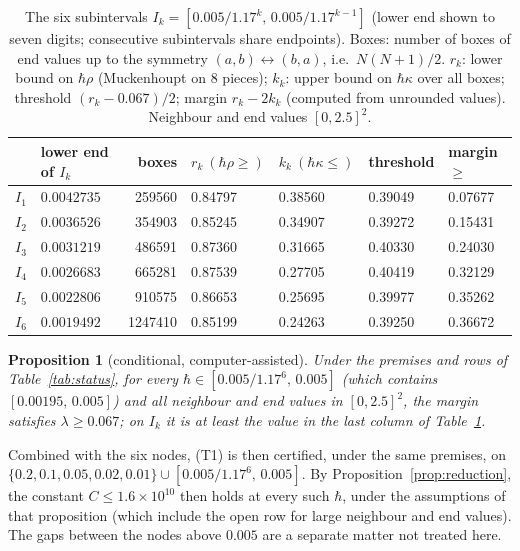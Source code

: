 \documentclass[11pt,a4paper]{article}
\newtheorem{proposition}[theorem]{Proposition}
\theoremstyle{definition}
\theoremstyle{remark}
\newcommand{\hk}{\hbar\kappa}
\newcommand{\hr}{\hbar\rho}
\begin{document}
\begin{table}[!htbp]\centering\small
\caption{The six subintervals $I_k=[0.005/1.17^k,\,0.005/1.17^{k-1}]$ (lower end shown to seven digits; consecutive subintervals share endpoints). Boxes: number of boxes of end values up to the symmetry $(a,b)\leftrightarrow(b,a)$, i.e.\ $N(N+1)/2$. $r_k$: lower bound on $\hr$ (Muckenhoupt on $8$ pieces); $k_k$: upper bound on $\hk$ over all boxes; threshold $(r_k-0.067)/2$; margin $r_k-2k_k$ (computed from unrounded values). Neighbour and end values $[0,2.5]^2$.}\label{tab:results}
\begin{tabular}{@{}llrllll@{}}\toprule
 & lower end of $I_k$ & boxes & $r_k\ (\hr\ge)$ & $k_k\ (\hk\le)$ & threshold & margin $\ge$\\\midrule
$I_1$ & $0.0042735$ & 259560 & 0.84797 & 0.38560 & 0.39049 & 0.07677\\
$I_2$ & $0.0036526$ & 354903 & 0.85245 & 0.34907 & 0.39272 & 0.15431\\
$I_3$ & $0.0031219$ & 486591 & 0.87360 & 0.31665 & 0.40330 & 0.24030\\
$I_4$ & $0.0026683$ & 665281 & 0.87539 & 0.27705 & 0.40419 & 0.32129\\
$I_5$ & $0.0022806$ & 910575 & 0.86653 & 0.25695 & 0.39977 & 0.35262\\
$I_6$ & $0.0019492$ & 1247410 & 0.85199 & 0.24263 & 0.39250 & 0.36672\\\bottomrule
\end{tabular}
\end{table}

\begin{proposition}[conditional, computer-assisted]\label{prop:main}
Under the premises and rows of Table~\ref{tab:status}, for every $\hbar\in[0.005/1.17^6,\,0.005]$ (which contains $[0.00195,\,0.005]$) and all neighbour and end values in $[0,2.5]^2$, the margin satisfies $\lambda\ge0.067$; on $I_k$ it is at least the value in the last column of Table~\ref{tab:results}.
\end{proposition}

Combined with the six nodes, (T1) is then certified, under the same premises, on $\{0.2,0.1,0.05,0.02,0.01\}\cup[0.005/1.17^6,\,0.005]$. By Proposition~\ref{prop:reduction}, the constant $C\le1.6\times10^{10}$ then holds at every such $\hbar$, under the assumptions of that proposition (which include the open row for large neighbour and end values). The gaps between the nodes above $0.005$ are a separate matter not treated here.
\end{document}
